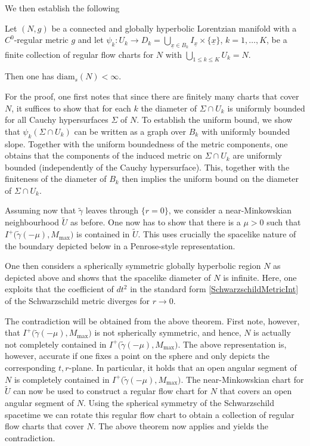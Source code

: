 \documentclass[reqno]{article}
\newcommand{\diam}{\mathrm{diam}}
\newcommand{\ux}{\underline{x}}
\newcommand{\Mmax}{M_{\mathrm{max}}}
\begin{document}
We then establish the following
\begin{theorem*}\label{schwthm:connected_globally_hyperbolic_lorentzian}
Let $(N,g)$ be a connected and globally hyperbolic Lorentzian manifold with a $C^0$-regular metric $g$ and let $\psi_k : U_k \to D_k = \bigcup_{\ux \in B_k} I_{\ux} \times \{\ux\}$, $k = 1, \ldots, K$, be a finite collection of regular flow charts for $N$ with $\bigcup_{1 \leq k \leq K} U_k = N$.

Then one has $\diam_s(N) < \infty$.
\end{theorem*}
For the proof, one first notes that since there are finitely many charts that cover $N$, it suffices to show that for each $k$ the diameter of $\Sigma \cap U_k$ is uniformly bounded for all Cauchy hypersurfaces $\Sigma$ of $N$. To establish the uniform bound, we show that $\psi_k(\Sigma \cap U_k)$ can be written as a graph over $B_k$ with uniformly bounded slope. Together with the uniform boundedness of the metric components, one obtains that the components of the induced metric on $\Sigma \cap U_k$ are uniformly bounded (independently of the Cauchy hypersurface). This, together with the finiteness of the diameter of $B_k$ then implies the uniform bound on the diameter of $\Sigma \cap U_k$.

Assuming now that $\tilde{\gamma}$ leaves through $\{r=0\}$, we consider a near-Minkowskian neighbourhood $\tilde{U}$ as before. One now has to show that there is a $\mu >0$ such that $I^+\big(\tilde{\gamma}(-\mu), \Mmax\big)$ is contained in $\tilde{U}$. This uses crucially the spacelike nature of the boundary depicted below in a Penrose-style representation.
\begin{center}
\def\svgwidth{9cm}

\end{center}
One then considers a spherically symmetric globally hyperbolic region $N$ as depicted above and shows that the spacelike diameter of $N$ is infinite. Here, one exploits that the coefficient of $dt^2$ in the standard form \eqref{SchwarzschildMetricInt} of the Schwarzschild metric diverges for $r \to 0$.  

The contradiction will be obtained from the above theorem. First note, however, that $I^+\big(\tilde{\gamma}(-\mu), \Mmax\big)$ is not spherically symmetric, and hence, $N$ is actually not completely contained in $I^+\big(\tilde{\gamma}(-\mu), \Mmax\big)$. The above representation is, however, accurate if one fixes a point on the sphere and only depicts the corresponding $t,r$-plane. In particular, it holds that an open angular segment of $N$ is completely contained in $I^+\big(\tilde{\gamma}(-\mu), \Mmax\big)$. The near-Minkowskian chart for $\tilde{U}$ can now be used to construct a regular flow chart for $N$ that covers an open angular segment of $N$. Using the spherical symmetry of the Schwarzschild spacetime we can rotate this regular flow chart to obtain a collection of regular flow charts that cover $N$. The above theorem now applies and yields the contradiction.
\end{document}
